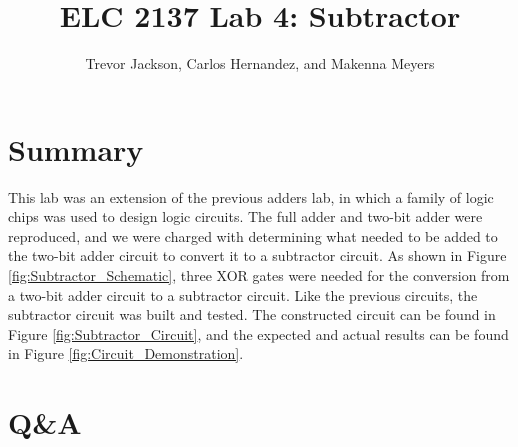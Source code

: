 \documentclass[11pt]{article}
\begin{document}
\title{ELC 2137 Lab 4: Subtractor}
\author{Trevor Jackson, Carlos Hernandez, and Makenna Meyers}

\maketitle


\section*{Summary}

This lab was an extension of the previous adders lab, in which a family of logic chips was used to design logic circuits. The full adder and two-bit adder were reproduced, and we were charged with determining what needed to be added to the two-bit adder circuit to convert it to a subtractor circuit. As shown in Figure \ref{fig:Subtractor_Schematic}, three XOR gates were needed for the conversion from a two-bit adder circuit to a subtractor circuit. Like the previous circuits, the subtractor circuit was built and tested. The constructed circuit can be found in Figure \ref{fig:Subtractor_Circuit}, and the expected and actual results can be found in Figure \ref{fig:Circuit_Demonstration}.

\section*{Q\&A}
\end{document}
